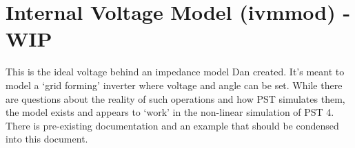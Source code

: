 \section{Internal Voltage Model (ivmmod) - WIP}  
This is the ideal voltage behind an impedance model Dan created.
It's meant to model a `grid forming' inverter where voltage and angle can be set.
While there are questions about the reality of such operations and how PST simulates them, the model exists and appears to `work' in the non-linear simulation  of PST 4.
There is pre-existing documentation and an example that should be condensed into this document.